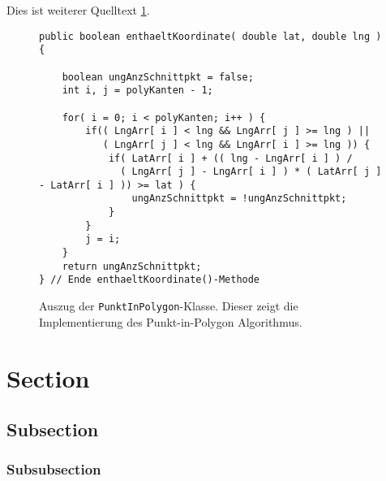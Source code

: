 Dies ist weiterer Quelltext \ref{fig:punktinpolygon}.
\begin{figure}[H]
\begin{lstlisting}[firstnumber=11]
public boolean enthaeltKoordinate( double lat, double lng ) {

    boolean ungAnzSchnittpkt = false;
    int i, j = polyKanten - 1;

    for( i = 0; i < polyKanten; i++ ) {
        if(( LngArr[ i ] < lng && LngArr[ j ] >= lng ) ||
           ( LngArr[ j ] < lng && LngArr[ i ] >= lng )) {
            if( LatArr[ i ] + (( lng - LngArr[ i ] ) / 
              ( LngArr[ j ] - LngArr[ i ] ) * ( LatArr[ j ] - LatArr[ i ] )) >= lat ) {
                ungAnzSchnittpkt = !ungAnzSchnittpkt;
            }
        }
        j = i;
    }
    return ungAnzSchnittpkt;
} // Ende enthaeltKoordinate()-Methode
\end{lstlisting}
\caption[Auszug der PunktInPolygon-Klasse]{Auszug der \texttt{PunktInPolygon}-Klasse. Dieser zeigt die Implementierung des Punkt-in-Polygon Algorithmus.}
\label{fig:punktinpolygon}
\end{figure} 




\section{Section}



\subsection{Subsection}

\subsubsection{Subsubsection}

